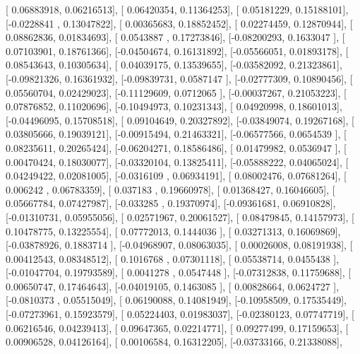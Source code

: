 \documentclass{article}
\begin{document}
       [ 0.06883918,  0.06216513],
       [ 0.06420354,  0.11364253],
       [ 0.05181229,  0.15188101],
       [-0.0228841 ,  0.13047822],
       [ 0.00365683,  0.18852452],
       [ 0.02274459,  0.12870944],
       [ 0.08862836,  0.01834693],
       [ 0.0543887 ,  0.17273846],
       [-0.08200293,  0.1633047 ],
       [ 0.07103901,  0.18761366],
       [-0.04504674,  0.16131892],
       [-0.05566051,  0.01893178],
       [ 0.08543643,  0.10305634],
       [ 0.04039175,  0.13539655],
       [-0.03582092,  0.21323861],
       [-0.09821326,  0.16361932],
       [-0.09839731,  0.0587147 ],
       [-0.02777309,  0.10890456],
       [ 0.05560704,  0.02429023],
       [-0.11129609,  0.0712065 ],
       [-0.00037267,  0.21053223],
       [ 0.07876852,  0.11020696],
       [-0.10494973,  0.10231343],
       [ 0.04920998,  0.18601013],
       [-0.04496095,  0.15708518],
       [ 0.09104649,  0.20327892],
       [-0.03849074,  0.19267168],
       [ 0.03805666,  0.19039121],
       [-0.00915494,  0.21463321],
       [-0.06577566,  0.0654539 ],
       [ 0.08235611,  0.20265424],
       [-0.06204271,  0.18586486],
       [ 0.01479982,  0.0536947 ],
       [ 0.00470424,  0.18030077],
       [-0.03320104,  0.13825411],
       [-0.05888222,  0.04065024],
       [ 0.04249422,  0.02081005],
       [-0.0316109 ,  0.06934191],
       [ 0.08002476,  0.07681264],
       [ 0.006242  ,  0.06783359],
       [ 0.037183  ,  0.19660978],
       [ 0.01368427,  0.16046605],
       [ 0.05667784,  0.07427987],
       [-0.033285  ,  0.19370974],
       [-0.09361681,  0.06910828],
       [-0.01310731,  0.05955056],
       [ 0.02571967,  0.20061527],
       [ 0.08479845,  0.14157973],
       [ 0.10478775,  0.13225554],
       [ 0.07772013,  0.1444036 ],
       [ 0.03271313,  0.16069869],
       [-0.03878926,  0.1883714 ],
       [-0.04968907,  0.08063035],
       [ 0.00026008,  0.08191938],
       [ 0.00412543,  0.08348512],
       [ 0.1016768 ,  0.07301118],
       [ 0.05538714,  0.0455438 ],
       [-0.01047704,  0.19793589],
       [ 0.0041278 ,  0.0547448 ],
       [-0.07312838,  0.11759688],
       [ 0.00650747,  0.17464643],
       [-0.04019105,  0.1463085 ],
       [ 0.00828664,  0.0624727 ],
       [-0.0810373 ,  0.05515049],
       [ 0.06190088,  0.14081949],
       [-0.10958509,  0.17535449],
       [-0.07273961,  0.15923579],
       [ 0.05224403,  0.01983037],
       [-0.02380123,  0.07747719],
       [ 0.06216546,  0.04239413],
       [ 0.09647365,  0.02214771],
       [ 0.09277499,  0.17159653],
       [ 0.00906528,  0.04126164],
       [ 0.00106584,  0.16312205],
       [-0.03733166,  0.21338088],
\end{document}
